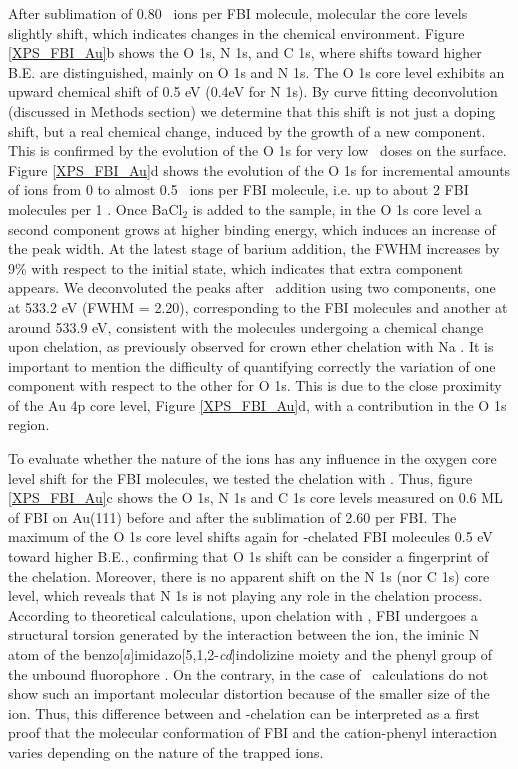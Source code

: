 \documentclass[aps,prl,reprint,longbibliography,superscriptaddress, english]{revtex4-1}
\def\BappCl{BaCl$_2$ }
\begin{document}
After sublimation of 0.80 \Bapp\ ions per FBI molecule, molecular the core levels slightly shift, which indicates changes in the chemical environment. Figure {\ref{XPS_FBI_Au}b} shows the O 1s, N 1s, and C 1s, where shifts toward higher B.E. are distinguished, mainly on O 1s and N 1s. The O 1s core level exhibits an upward chemical shift of 0.5 eV (0.4eV for N 1s). By curve fitting deconvolution (discussed in Methods section) we determine that this shift is not just a doping shift, but a real chemical change, induced by the growth of a new component. This is confirmed by the evolution of the O 1s for very low \Bapp\ doses on the surface. Figure {\ref{XPS_FBI_Au}d} shows the evolution of the O 1s for incremental amounts of \Bapp ions from 0 to almost 0.5 \Bapp\ ions per FBI molecule, i.e. up to about 2 FBI {molecules} per 1 \Bapp. Once \BappCl is added to the sample, in the O 1s core level a second component grows at higher binding energy, which induces an increase of the peak width. At the latest stage of barium addition, the FWHM increases by 9\% with respect to the initial state, which indicates that extra component appears. We deconvoluted the peaks after \Bapp\ addition using two components, one at 533.2 eV (FWHM = 2.20), corresponding to the FBI molecules and another at around 533.9 eV, consistent with the molecules undergoing a chemical change upon chelation, as previously observed for crown ether chelation with Na \cite{stredansky_-surface_2019}. It is important to mention the difficulty of quantifying correctly the variation of one component with respect to the other for O 1s. This is due to the close proximity of the Au 4p core level, Figure {\ref{XPS_FBI_Au}d}, with a contribution in the O 1s region.

To evaluate whether the nature of the ions has any influence in the oxygen core level shift for the FBI molecules, we tested the chelation with \Nap. Thus, figure {\ref{XPS_FBI_Au}c} shows the O 1s, N 1s and C 1s core levels measured on 0.6 ML of FBI on Au(111) before and after the sublimation of 2.60 \Nap per FBI. The maximum of the O 1s core level shifts again for \Nap-chelated FBI molecules 0.5 eV toward higher B.E., confirming that O 1s shift can be consider a fingerprint of the chelation. Moreover, there is no apparent shift on the N 1s (nor C 1s) core level, which reveals that N 1s is not playing any role in the chelation process. According to theoretical calculations, upon chelation with \Bapp, FBI undergoes a structural torsion generated by the interaction between the ion, the iminic N atom of the benzo[\textit{a}]imidazo[5,1,2-\textit{cd}]indolizine moiety and the phenyl group of the unbound fluorophore \cite{rivilla_fluorescent_2020}. On the contrary, in the case of \Nap\ calculations do not show such an important molecular distortion because of the smaller size of the ion. Thus, this difference between \Bapp\- and \Nap-chelation can be interpreted as a first proof that the molecular conformation of FBI and the cation-phenyl interaction varies depending on the nature of the trapped ions. 
\end{document}
